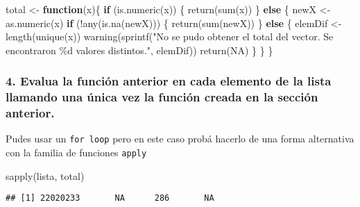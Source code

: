 \documentclass[
]{article}
\newenvironment{Shaded}{\begin{snugshade}}{\end{snugshade}}
\newcommand{\ConstantTok}[1]{\textcolor[rgb]{0.00,0.00,0.00}{#1}}
\newcommand{\ControlFlowTok}[1]{\textcolor[rgb]{0.13,0.29,0.53}{\textbf{#1}}}
\newcommand{\FunctionTok}[1]{\textcolor[rgb]{0.00,0.00,0.00}{#1}}
\newcommand{\NormalTok}[1]{#1}
\newcommand{\OtherTok}[1]{\textcolor[rgb]{0.56,0.35,0.01}{#1}}
\newcommand{\SpecialCharTok}[1]{\textcolor[rgb]{0.00,0.00,0.00}{#1}}
\newcommand{\StringTok}[1]{\textcolor[rgb]{0.31,0.60,0.02}{#1}}
\begin{document}
\begin{Shaded}
\begin{Highlighting}[]
\NormalTok{total }\OtherTok{\textless{}{-}} \ControlFlowTok{function}\NormalTok{(x)\{}
  \ControlFlowTok{if}\NormalTok{ (}\FunctionTok{is.numeric}\NormalTok{(x)) \{}
    \FunctionTok{return}\NormalTok{(}\FunctionTok{sum}\NormalTok{(x))}
\NormalTok{  \} }\ControlFlowTok{else}\NormalTok{ \{}
\NormalTok{    newX }\OtherTok{\textless{}{-}} \FunctionTok{as.numeric}\NormalTok{(x)}
    \ControlFlowTok{if}\NormalTok{ (}\SpecialCharTok{!}\FunctionTok{any}\NormalTok{(}\FunctionTok{is.na}\NormalTok{(newX))) \{}
      \FunctionTok{return}\NormalTok{(}\FunctionTok{sum}\NormalTok{(newX))}
\NormalTok{    \} }\ControlFlowTok{else}\NormalTok{ \{}
\NormalTok{      elemDif }\OtherTok{\textless{}{-}} \FunctionTok{length}\NormalTok{(}\FunctionTok{unique}\NormalTok{(x))}
      \FunctionTok{warning}\NormalTok{(}\FunctionTok{sprintf}\NormalTok{(}\StringTok{"No se pudo obtener el total del vector. Se encontraron \%d valores distintos."}\NormalTok{, elemDif))}
      \FunctionTok{return}\NormalTok{(}\ConstantTok{NA}\NormalTok{)}
\NormalTok{    \}}
\NormalTok{  \}}
\NormalTok{\}}
\end{Highlighting}
\end{Shaded}

\hypertarget{evalua-la-funciuxf3n-anterior-en-cada-elemento-de-la-lista-llamando-una-uxfanica-vez-la-funciuxf3n-creada-en-la-secciuxf3n-anterior.}{%
\subsubsection{4. Evalua la función anterior en cada elemento de la
lista llamando una única vez la función creada en la sección
anterior.}\label{evalua-la-funciuxf3n-anterior-en-cada-elemento-de-la-lista-llamando-una-uxfanica-vez-la-funciuxf3n-creada-en-la-secciuxf3n-anterior.}}

Pudes usar un \texttt{for\ loop} pero en este caso probá hacerlo de una
forma alternativa con la familia de funciones \texttt{apply}

\begin{Shaded}
\begin{Highlighting}[]
\FunctionTok{sapply}\NormalTok{(lista, total)}
\end{Highlighting}
\end{Shaded}

\begin{verbatim}
## [1] 22020233       NA      286       NA
\end{verbatim}
\end{document}
